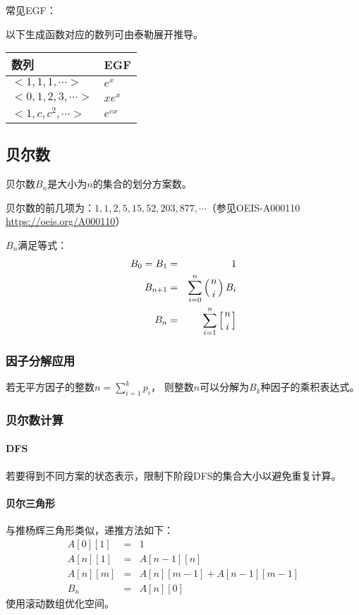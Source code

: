 常见EGF：

以下生成函数对应的数列可由泰勒展开推导。

\begin{tabular}{|l|l|}
	\hline
	数列               & EGF      \\
	\hline
	$<1,1,1,\cdots>$   & $e^x$    \\
	\hline
	$<0,1,2,3,\cdots>$ & $xe^x$   \\
	\hline
	$<1,c,c^2,\cdots>$ & $e^{cx}$ \\
	\hline
\end{tabular}

\subsection{贝尔数}
贝尔数$B_n$是大小为$n$的集合的划分方案数。

贝尔数的前几项为：$1, 1, 2, 5, 15, 52, 203, 877,\cdots$（参见OEIS-A000110\\
\url{https://oeis.org/A000110}）

$B_n$满足等式：
\begin{eqnarray*}
	B_0=B_1&=&1\\
	B_{n+1}&=&\sum_{i=0}^n{\left(n \atop i\right)B_i}\\
	B_n&=&\sum_{i=1}^n{\left[n \atop i\right]}
\end{eqnarray*}

\subsubsection{因子分解应用}
若无平方因子的整数$\displaystyle n=\sum_{i=1}^k{p_i}$，
则整数$n$可以分解为$B_k$种因子的乘积表达式。
\subsubsection{贝尔数计算}
\paragraph{DFS}若要得到不同方案的状态表示，限制下阶段DFS的集合大小以避免重复计算。
\paragraph{贝尔三角形}
与推杨辉三角形类似，递推方法如下：
\begin{eqnarray*}
	A[0][1]&=&1\\
	A[n][1]&=&A[n-1][n]\\
	A[n][m]&=&A[n][m-1]+A[n-1][m-1]\\
	B_n&=&A[n][0]
\end{eqnarray*}
使用滚动数组优化空间。

